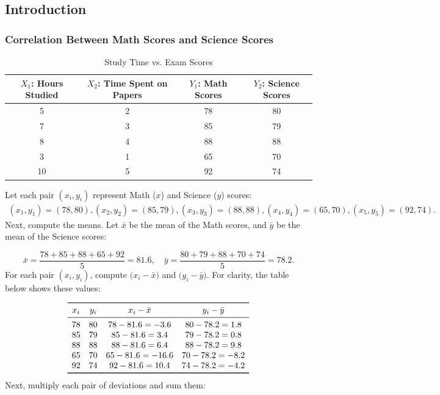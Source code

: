 \documentclass[11pt]{report} %
\begin{document}
\subsection{Introduction}
\subsubsection{Correlation Between Math Scores and Science Scores}
\label{Math Sci Cor}
\setlength{\tabcolsep}{4pt} %
\begin{table}[H]
    \centering
    \begin{tabular}{|c|c|c|c|}
        \hline
        \( X_1 \): Hours Studied & \( X_2 \): Time Spent on Papers & \( Y_1 \): Math Scores & \( Y_2 \): Science Scores\\
        \hline
        5  & 2  & 78 & 80 \\
        7  & 3  & 85 & 79 \\
        8  & 4  & 88 & 88 \\
        3  & 1  & 65 & 70 \\
        10 & 5  & 92 & 74 \\
        \hline
    \end{tabular}
    \caption{Study Time vs. Exam Scores}
    \label{tab:study_scoresA}
\end{table}

Let each pair \((x_i, y_i)\) represent Math (\(x\)) and Science (\(y\)) scores:
\[
\begin{aligned}
(x_1, y_1) = (78, 80),
(x_2, y_2) = (85, 79),
(x_3, y_3) = (88, 88),
(x_4, y_4) = (65, 70),
(x_5, y_5) = (92, 74).
\end{aligned}
\]
Next, compute the means. Let \(\bar{x}\) be the mean of the Math scores, and \(\bar{y}\) be the mean of the Science scores:

\[
\bar{x} = \frac{78 + 85 + 88 + 65 + 92}{5} = 81.6,\quad
\bar{y} = \frac{80 + 79 + 88 + 70 + 74}{5} = 78.2.
\]
For each pair \((x_i, y_i)\), compute \(\bigl(x_i - \bar{x}\bigr)\) and \(\bigl(y_i - \bar{y}\bigr)\). For clarity, the table below shows these values:

\[
\begin{array}{cccc}
\toprule
x_i & y_i & x_i - \bar{x} & y_i - \bar{y} \\
\midrule
78 & 80 & 78 - 81.6 = -3.6 & 80 - 78.2 = 1.8 \\
85 & 79 & 85 - 81.6 = 3.4  & 79 - 78.2 = 0.8 \\
88 & 88 & 88 - 81.6 = 6.4  & 88 - 78.2 = 9.8 \\
65 & 70 & 65 - 81.6 = -16.6 & 70 - 78.2 = -8.2 \\
92 & 74 & 92 - 81.6 = 10.4 & 74 - 78.2 = -4.2 \\
\bottomrule
\end{array}
\]
Next, multiply each pair of deviations and sum them:
\end{document}
